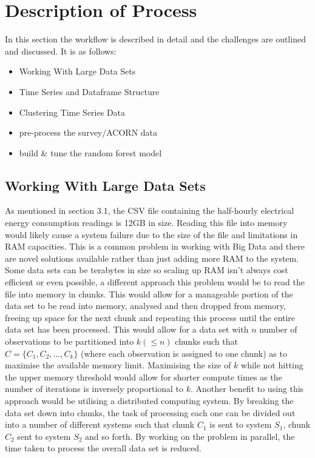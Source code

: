 \section{Description of Process}
    In this section the workflow is described in detail and the challenges are outlined and discussed. It is as follows:
    \begin{itemize}
        \item Working With Large Data Sets
        \item Time Series and Dataframe Structure
        \item Clustering Time Series Data
        \item pre-process the survey/ACORN data
        \item build \& tune the random forest model
    \end{itemize}
    
    \subsection{Working With Large Data Sets}
    As mentioned in section 3.1, the CSV file containing the half-hourly electrical energy consumption readings is 12GB in size. Reading this file into memory would likely cause a system failure due to the size of the file and limitations in RAM capacities. This is a common problem in working with Big Data and there are novel solutions available rather than just adding more RAM to the system. Some data sets can be terabytes in size so scaling up RAM isn't always cost efficient or even possible, a different approach this problem would be to read the file into memory in chunks. This would allow for a manageable portion of the data set to be read into memory, analysed and then dropped from memory, freeing up space for the next chunk and repeating this process until the entire data set has been processed. This would allow for a data set with $n$ number of observations to be partitioned into $k(\leq n)$ chunks such that $C = \{C_1, C_2, \dots, C_k\}$ (where each observation is assigned to one chunk) as to maximise the available memory limit. Maximising the size of $k$ while not hitting the upper memory threshold would allow for shorter compute times as the number of iterations is inversely proportional to $k$. Another benefit to using this approach would be utilising a distributed computing system. By breaking the data set down into chunks, the task of processing each one can be divided out into a number of different systems such that chunk $C_1$ is sent to system $S_1$, chunk $C_2$ sent to system $S_2$ and so forth. By working on the problem in parallel, the time taken to process the overall data set is reduced.
    
